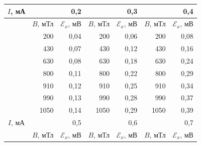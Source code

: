 \begin{longtable}[c]{c|rr|rr|rr|}
	\hline
	\multicolumn{1}{|c|}{$I$, мА} & \multicolumn{2}{r|}{0,2}                          & \multicolumn{2}{r|}{0,3}                          & \multicolumn{2}{r|}{0,4}                          \\ \hline
	\endfirsthead
	\endhead
	& \multicolumn{1}{c|}{$B$, мТл} & $\mathcal{E}_x$, мВ & \multicolumn{1}{c|}{$B$, мТл} & $\mathcal{E}_x$, мВ & \multicolumn{1}{c|}{$B$, мТл} & $\mathcal{E}_x$, мВ \\ \cline{2-7} 
	& \multicolumn{1}{r|}{200}   & 0,04               & \multicolumn{1}{r|}{200}  & 0,06               & \multicolumn{1}{r|}{200}   & 0,08               \\ \cline{2-7} 
	& \multicolumn{1}{r|}{430}   & 0,07               & \multicolumn{1}{r|}{430}   & 0,12               & \multicolumn{1}{r|}{430}   & 0,16               \\ \cline{2-7} 
	& \multicolumn{1}{r|}{630}   & 0,08               & \multicolumn{1}{r|}{630}   & 0,18               & \multicolumn{1}{r|}{630}   & 0,24               \\ \cline{2-7} 
	& \multicolumn{1}{r|}{800}   & 0,11               & \multicolumn{1}{r|}{800}   & 0,22               & \multicolumn{1}{r|}{800}   & 0,29               \\ \cline{2-7} 
	& \multicolumn{1}{r|}{910}   & 0,12               & \multicolumn{1}{r|}{910}   & 0,25               & \multicolumn{1}{r|}{910}   & 0,34               \\ \cline{2-7} 
	& \multicolumn{1}{r|}{990}   & 0,13               & \multicolumn{1}{r|}{990}   & 0,28               & \multicolumn{1}{r|}{990}   & 0,37               \\ \cline{2-7} 
	& \multicolumn{1}{r|}{1050}  & 0,14               & \multicolumn{1}{r|}{1050}  & 0,29               & \multicolumn{1}{r|}{1050}  & 0,39               \\ \hline
	\multicolumn{1}{|c|}{$I$, мА} & \multicolumn{2}{r|}{0,5}                          & \multicolumn{2}{r|}{0,6}                          & \multicolumn{2}{r|}{0,7}                          \\ \hline
	& \multicolumn{1}{c|}{$B$, мТл} & $\mathcal{E}_x$, мВ & \multicolumn{1}{c|}{$B$, мТл} & $\mathcal{E}_x$, мВ & \multicolumn{1}{c|}{$B$, мТл} & $\mathcal{E}_x$, мВ \\ \cline{2-7} 

\end{longtable}

